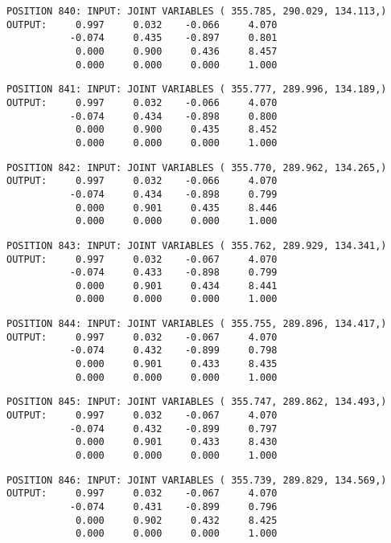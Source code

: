 \begin{verbatim}
POSITION 840: INPUT: JOINT VARIABLES ( 355.785, 290.029, 134.113,)
OUTPUT:     0.997     0.032    -0.066     4.070
           -0.074     0.435    -0.897     0.801
            0.000     0.900     0.436     8.457
            0.000     0.000     0.000     1.000
\end{verbatim} \pagebreak[1]\begin{verbatim}
POSITION 841: INPUT: JOINT VARIABLES ( 355.777, 289.996, 134.189,)
OUTPUT:     0.997     0.032    -0.066     4.070
           -0.074     0.434    -0.898     0.800
            0.000     0.900     0.435     8.452
            0.000     0.000     0.000     1.000
\end{verbatim} \pagebreak[1]\begin{verbatim}
POSITION 842: INPUT: JOINT VARIABLES ( 355.770, 289.962, 134.265,)
OUTPUT:     0.997     0.032    -0.066     4.070
           -0.074     0.434    -0.898     0.799
            0.000     0.901     0.435     8.446
            0.000     0.000     0.000     1.000
\end{verbatim} \pagebreak[1]\begin{verbatim}
POSITION 843: INPUT: JOINT VARIABLES ( 355.762, 289.929, 134.341,)
OUTPUT:     0.997     0.032    -0.067     4.070
           -0.074     0.433    -0.898     0.799
            0.000     0.901     0.434     8.441
            0.000     0.000     0.000     1.000
\end{verbatim} \pagebreak[1]\begin{verbatim}
POSITION 844: INPUT: JOINT VARIABLES ( 355.755, 289.896, 134.417,)
OUTPUT:     0.997     0.032    -0.067     4.070
           -0.074     0.432    -0.899     0.798
            0.000     0.901     0.433     8.435
            0.000     0.000     0.000     1.000
\end{verbatim} \pagebreak[1]\begin{verbatim}
POSITION 845: INPUT: JOINT VARIABLES ( 355.747, 289.862, 134.493,)
OUTPUT:     0.997     0.032    -0.067     4.070
           -0.074     0.432    -0.899     0.797
            0.000     0.901     0.433     8.430
            0.000     0.000     0.000     1.000
\end{verbatim} \pagebreak[1]\begin{verbatim}
POSITION 846: INPUT: JOINT VARIABLES ( 355.739, 289.829, 134.569,)
OUTPUT:     0.997     0.032    -0.067     4.070
           -0.074     0.431    -0.899     0.796
            0.000     0.902     0.432     8.425
            0.000     0.000     0.000     1.000
\end{verbatim} \pagebreak[1]\begin{verbatim}

\end{verbatim}
